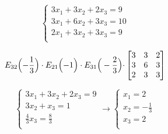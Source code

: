 \documentclass[unicode,11pt,a4paper,oneside,numbers=endperiod,openany]{scrartcl}
\begin{document}
\begin{equation*}
    \begin{cases}
        3 x_1 + 3 x_2 + 2 x_3 = 9  \\
        3 x_1 + 6 x_2 + 3 x_3 = 10 \\
        2 x_1 + 3 x_2 + 3 x_3 = 9  \\
    \end{cases}
\end{equation*}

\begin{equation*}
    E_{32} \Bigl( -\frac{1}{3} \Bigr) \cdot E_{21} \Bigl( -1 \Bigr) \cdot E_{31} \Big( -\frac{2}{3} \Bigl)
    \cdot
    \begin{bmatrix} 3 & 3 & 2 \\ 3 & 6 & 3 \\ 2 & 3 & 3 \\ \end{bmatrix}
\end{equation*}

\begin{equation*}
    \begin{cases}
        3 x_1 + 3 x_2 + 2 x_3 = 9     \\
        3 x_2 + x_3 = 1               \\
        \frac{4}{3} x_3 = \frac{8}{3} \\
    \end{cases}
    \rightarrow
    \begin{cases}
        x_1 = 2             \\
        x_2 = - \frac{1}{3} \\
        x_3 = 2             \\
    \end{cases}
\end{equation*}
\end{document}
